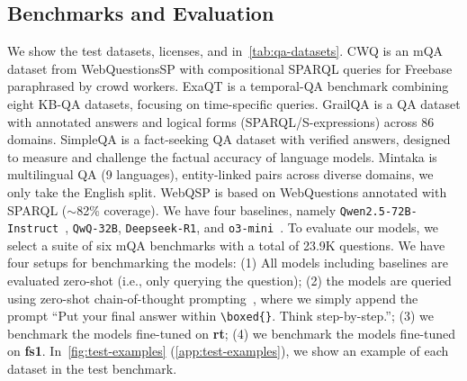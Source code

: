\documentclass[11pt]{article}
\newcommand{\rone}{\texttt{Deepseek-R1}}
\newcommand{\qwq}{\texttt{QwQ-32B}}
\newcommand{\dataset}{\textbf{fs1}}
\newcommand{\datasetrt}{\textbf{\textbf{rt}}}
\begin{document}
\subsection{Benchmarks and Evaluation}\label{subsec:eval}
We show the test datasets, licenses, and in~\cref{tab:qa-datasets}. CWQ is an mQA dataset from WebQuestionsSP with compositional SPARQL queries for Freebase paraphrased by crowd workers. ExaQT is a temporal-QA benchmark combining eight KB-QA datasets, focusing on time-specific queries. GrailQA is a QA dataset with annotated answers and logical forms (SPARQL/S-expressions) across 86 domains. SimpleQA is a fact-seeking QA dataset with verified answers, designed to measure and challenge the factual accuracy of language models. Mintaka is multilingual QA (9 languages), entity-linked pairs across diverse domains, we only take the English split. WebQSP is based on WebQuestions annotated with SPARQL ($\sim$82\% coverage).
We have four baselines, namely \texttt{Qwen2.5-72B-Instruct}~\citep{qwen2.5}, \qwq{}, \rone{}, and \texttt{o3-mini}~\citep{o3-mini}. 
To evaluate our models, we select a suite of six mQA benchmarks with a total of 23.9K questions. 
We have four setups for benchmarking the models: (1) All models including baselines are evaluated zero-shot (i.e., only querying the question); (2) the models are queried using zero-shot chain-of-thought prompting~\citep{kojima2022large, wei2022chain}, where we simply append the prompt ``Put your final answer within \verb|\boxed{}|. Think step-by-step.''; (3) we benchmark the models fine-tuned on \datasetrt{}; (4) we benchmark the models fine-tuned on \dataset{}.
In~\cref{fig:test-examples} (\cref{app:test-examples}), we show an example of each dataset in the test benchmark. 
\end{document}
